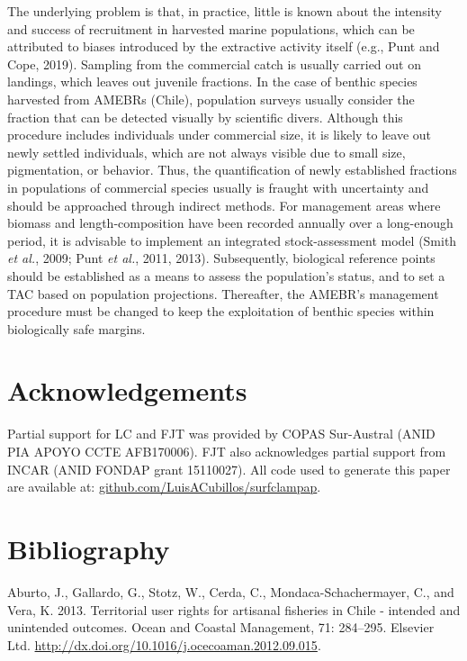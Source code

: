 \documentclass[12pt]{article}
\begin{document}
The underlying problem is that, in practice, little is known about the
intensity and success of recruitment in harvested marine populations,
which can be attributed to biases introduced by the extractive activity
itself (e.g., Punt and Cope, 2019). Sampling from the commercial catch
is usually carried out on landings, which leaves out juvenile fractions.
In the case of benthic species harvested from AMEBRs (Chile), population
surveys usually consider the fraction that can be detected visually by
scientific divers. Although this procedure includes individuals under
commercial size, it is likely to leave out newly settled individuals,
which are not always visible due to small size, pigmentation, or
behavior. Thus, the quantification of newly established fractions in
populations of commercial species usually is fraught with uncertainty
and should be approached through indirect methods. For management areas
where biomass and length-composition have been recorded annually over a
long-enough period, it is advisable to implement an integrated
stock-assessment model (Smith \emph{et al.}, 2009; Punt \emph{et al.},
2011, 2013). Subsequently, biological reference points should be
established as a means to assess the population's status, and to set a
TAC based on population projections. Thereafter, the AMEBR's management
procedure must be changed to keep the exploitation of benthic species
within biologically safe margins.

\hypertarget{acknowledgements}{%
\section{Acknowledgements}\label{acknowledgements}}

Partial support for LC and FJT was provided by COPAS Sur-Austral (ANID
PIA APOYO CCTE AFB170006). FJT also acknowledges partial support from
INCAR (ANID FONDAP grant 15110027). All code used to generate this paper
are available at:
\href{https://github.com/LuisACubillos/surfclampap}{github.com/LuisACubillos/surfclampap}.

\FloatBarrier

\hypertarget{bibliography}{%
\section*{Bibliography}\label{bibliography}}

\hypertarget{refs}{}
\leavevmode\hypertarget{ref-Aburto2013}{}%
Aburto, J., Gallardo, G., Stotz, W., Cerda, C., Mondaca-Schachermayer,
C., and Vera, K. 2013. Territorial user rights for artisanal fisheries
in Chile - intended and unintended outcomes. Ocean and Coastal
Management, 71: 284--295. Elsevier Ltd.
\url{http://dx.doi.org/10.1016/j.ocecoaman.2012.09.015}.
\end{document}
